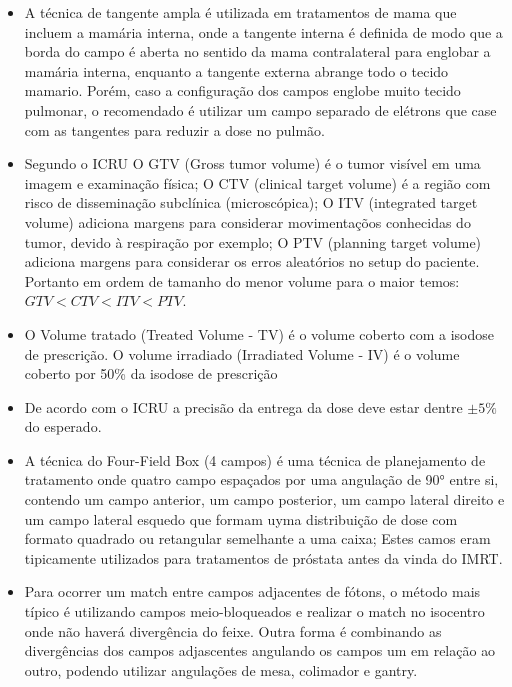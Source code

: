 \documentclass[11pt,a4paper]{article}
\newcounter{exemplo}
\begin{document}
\begin{exemplo}
\begin{itemize}
        \item A técnica de tangente ampla é utilizada em tratamentos de mama que incluem a mamária interna, onde a tangente interna é definida de modo que a borda do campo é aberta no sentido da mama contralateral para englobar a mamária interna, enquanto a tangente externa abrange todo o tecido mamario. Porém, caso a configuração dos campos englobe muito tecido pulmonar, o recomendado é utilizar um campo separado de elétrons que case com as tangentes para reduzir a dose no pulmão. 
        
        \item Segundo o ICRU O GTV (Gross tumor volume) é o tumor visível em uma imagem e examinação física; O CTV (clinical target volume) é a região com risco de disseminação subclínica (microscópica); O ITV (integrated target volume) adiciona margens para considerar movimentaçõos conhecidas do tumor, devido à respiração por exemplo; O PTV (planning target volume) adiciona margens para considerar os erros aleatórios no setup do paciente. Portanto em ordem de tamanho do menor volume para o maior temos: $GTV < CTV < ITV < PTV$.
        
        \item O Volume tratado (Treated Volume - TV) é o volume coberto com a isodose de prescrição. O volume irradiado (Irradiated Volume - IV) é o volume coberto por 50\% da  isodose de prescrição

        \item De acordo com o ICRU a precisão da entrega da dose deve estar dentre $\pm 5\%$ do esperado. 

        \item A técnica do Four-Field Box (4 campos) é uma técnica de planejamento de tratamento onde quatro campo espaçados por uma angulação de \ang{90} entre si, contendo um campo anterior, um campo posterior, um campo lateral direito e um campo lateral esquedo que formam uyma distribuição de dose com formato quadrado ou retangular semelhante a uma caixa; Estes camos eram tipicamente utilizados para tratamentos de próstata antes da vinda do IMRT. 
        
        \item Para ocorrer um match entre campos adjacentes de fótons, o método mais típico é utilizando campos meio-bloqueados e realizar o match no isocentro onde não haverá divergência do feixe. Outra forma é combinando as divergências dos campos adjascentes angulando os campos um em relação ao outro, podendo utilizar angulações de mesa, colimador e gantry. 
            

\end{itemize}
\end{exemplo}
\end{document}
